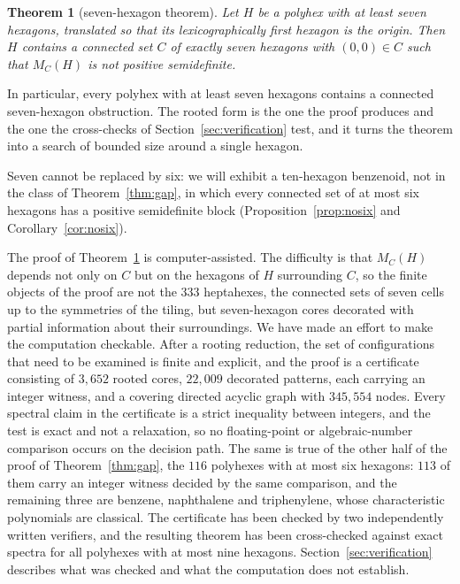 \documentclass[11pt]{article}
\newtheorem{theorem}{Theorem}[section]
\theoremstyle{definition}
\begin{document}
\begin{theorem}[seven-hexagon theorem]\label{thm:seven}
Let $H$ be a polyhex with at least seven hexagons, translated so that its
lexicographically first hexagon is the origin.  Then $H$ contains a connected
set $C$ of exactly seven hexagons with $(0,0)\in C$ such that $M_C(H)$ is not
positive semidefinite.
\end{theorem}

In particular, every polyhex with at least seven hexagons contains a connected
seven-hexagon obstruction.  The rooted form is the one the proof produces and
the one the cross-checks of Section~\ref{sec:verification} test, and it turns
the theorem into a search of bounded size around a single hexagon.

Seven cannot be replaced by six: we will exhibit a ten-hexagon benzenoid,
not in the class of Theorem~\ref{thm:gap}, in which every connected set of at
most six hexagons has a positive semidefinite block
(Proposition~\ref{prop:nosix} and Corollary~\ref{cor:nosix}).

The proof of Theorem~\ref{thm:seven} is computer-assisted.  The difficulty
is that $M_C(H)$ depends not only on $C$ but on the hexagons of $H$
surrounding $C$, so the finite objects of the proof are not the $333$
heptahexes, the connected sets of seven cells up to the symmetries of the
tiling, but seven-hexagon cores decorated with partial information about
their surroundings.  We have made an effort to make the computation
checkable.  After a rooting reduction, the set of configurations that need
to be examined is finite and explicit, and the proof is a certificate
consisting of $3{,}652$ rooted cores, $22{,}009$ decorated patterns, each
carrying an integer witness, and a covering directed acyclic graph with
$345{,}554$ nodes.  Every spectral claim in the certificate is a strict
inequality between integers, and the test is exact and not a relaxation, so
no floating-point or algebraic-number comparison occurs on the decision path.
The same is true of the other half of the proof of Theorem~\ref{thm:gap}, the
$116$ polyhexes with at most six hexagons: $113$ of them carry an integer
witness decided by the same comparison, and the remaining three are benzene,
naphthalene and triphenylene, whose characteristic polynomials are
classical.  The certificate has been checked by two independently written
verifiers, and the resulting theorem has been cross-checked against exact
spectra for all polyhexes with at most nine hexagons.
Section~\ref{sec:verification} describes what was checked and what the
computation does not establish.
\end{document}
